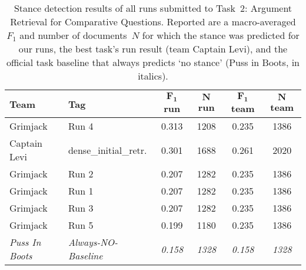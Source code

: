 \begin{table}[t]
\centering
\small
\renewcommand{\tabcolsep}{10pt}
\caption{Stance detection results of all runs submitted to Task~2: Argument Retrieval for Comparative Questions. Reported are a macro-averaged $F_1$ and number of documents~$N$ for which the stance was predicted for our runs, the best task's run result (team Captain Levi), and the official task baseline that always predicts `no stance' (Puss in Boots, in italics).}
\label{table-results-stance}
\begin{tabular}{@{}llcccc@{}}
\toprule
\textbf{Team} & \textbf{Tag} & \textbf{$\bm{F_1}$ run} & \textbf{$\bm{N}$ run} & \textbf{$\bm{F_1}$ team} & \textbf{$\bm{N}$ team} \\
\midrule
Grimjack & Run 4 & 0.313 & 1208 & 0.235 & 1386 \\
Captain Levi~\cite{RanaGJCEHP2022} & dense\_initial\_retr. & 0.301 & 1688 & 0.261 & 2020 \\
Grimjack & Run 2 & 0.207 & 1282 & 0.235 & 1386 \\
Grimjack & Run 1 & 0.207 & 1282 & 0.235 & 1386 \\
Grimjack & Run 3 & 0.207 & 1282 & 0.235 & 1386 \\
Grimjack & Run 5 & 0.199 & 1180 & 0.235 & 1386 \\
\textit{Puss In Boots}~\cite{BondarenkoFKSGBPBSWPH2022} & \textit{Always-NO-Baseline} & \textit{0.158} & \textit{1328} & \textit{0.158} & \textit{1328} \\
\bottomrule
\end{tabular}
\end{table}
